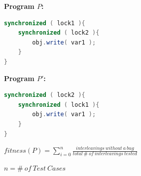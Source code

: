 \documentclass[10pt, conference, compsocconf]{IEEEtran}
\newcommand{\notesbox}[1]{
      \noindent\begin{center}\begin{boxedminipage}[h]{0.4\textwidth}{#1}\end{boxedminipage}\end{center}
}
\begin{document}
\begin{enumerate}
\vspace{2mm}
	\begin{minipage}{3.70cm}
\footnotesize{\textbf{ Program $P$:}}
\begin{lstlisting}[language=Java]
synchronized ( lock1 ){
	synchronized ( lock2 ){
		obj.write( var1 );
	}
}
\end{lstlisting}
\end{minipage}\hfill
\begin{minipage}{3.70cm}
\footnotesize{\textbf{ Program $P'$:}}
\begin{lstlisting}[language=Java]
synchronized ( lock2 ){
	synchronized ( lock1 ){
		obj.write( var1 );
	}
}
\end{lstlisting}
\end{minipage}

\end{enumerate}


\begin{footnotesize}
\begin{center}
$fitness(P) = \displaystyle\sum\limits_{i=0}^n\frac{interleavings\ without\ a\ bug}{total\ \#\ of\ interleavings\ tested}$
\end{center}
\end{footnotesize}
\begin{tiny}
\begin{center}
$n = \#\ of\ Test\ Cases$
\end{center}
\end{tiny}








%

\end{document}
